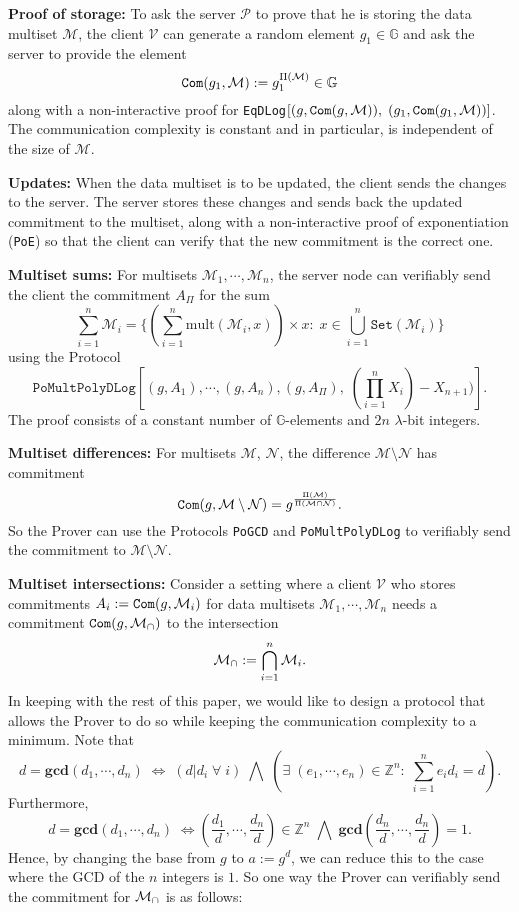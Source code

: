 \documentclass[11pt, lettersize, notitlepage, leqno, footskip=0.6cm]{article}
\newcommand{\bz}{\mathbb Z}
\newcommand{\pl}{\prod\limits}
\newcommand{\slim}{\sum\limits}
\newcommand{\ttt}{\texttt}
\newcommand{\sett}{\ttt{Set}}
\newcommand{\mul}{\mr{mult}}
\newcommand{\LRA}{\Longleftrightarrow}
\newcommand{\mc}{\mathcal}
\newcommand{\mb}{\mathbb}
\newcommand{\mbf}{\mathbf}
\newcommand{\mr}{\mathrm}
\newcommand{\sm}{\setminus}
\newcommand{\lam}{\lambda}
\newcommand{\mP}{\mc{P}}
\newcommand{\V}{\mc{V}}
\newcommand{\mcM}{\mc{M}}
\newcommand{\vs}{\vspace{-0.15cm}}
\newcommand{\noin}{\noindent}
\newcommand{\GCD}{\mbf{gcd}}
\numberwithin{equation}{section}
\begin{document}
\noin \textbf{Proof of storage:} To ask the server $\mP$ to prove that he is storing the data multiset $\mc{M}$, the client $\V$ can generate a random element $g_1\in\mb{G}$ and ask the server to provide the element \vs $$\protect{\verb|Com|}(g_1, \mc{M}):= g_1^{\Pi(\mc{M})}\in\mb{G}$$ along with a non-interactive proof for \verb|EqDLog|$[(g, \protect{\verb|Com|}(g, \mc{M})),\;(g_1, \protect{\verb|Com|}(g_1, \mc{M}))]$. The communication complexity is constant and in particular, is independent of the size of $\mc{M}$.\vspace{0.1cm}

\noin \textbf{Updates:} When the data multiset is to be updated, the client sends the changes to the server. The server stores these changes and sends back the updated commitment to the multiset, along with a non-interactive proof of exponentiation (\verb|PoE|) so that the client can verify that the new commitment is the correct one. \vspace{0.15cm}

\noin \textbf{Multiset sums:} For multisets $\mc{M}_1,\cdots,\mc{M}_n$, the server node can verifiably send the client the commitment $A_{\Pi}$ for the sum \vs $$\sum\limits_{i=1}^n \mc{M}_i = \Big\{(\sum\limits_{i=1}^n \mul(\mc{M}_i, x))\times x:\; x\in\bigcup\limits_{i=1}^n \sett(\mc{M}_i)\Big\} $$ using the Protocol \vs $$\ttt{PoMultPolyDLog}[(g, A_1),\cdots,(g,A_n), (g,A_{\Pi}),\;(\pl_{i=1}^{n}X_i)-X_{n+1})].$$ The proof consists of a constant number of $\mb{G}$-elements and $2n$ $\lam$-bit integers.

\bigskip

\noin \textbf{Multiset differences:} For multisets $\mc{M}$, $\mc{N}$, the difference $\mc{M}\sm \mc{N} $ has commitment \vs $$\protect{\verb|Com|}(g, \mc{M}\sm \mc{N}) = g^{\frac{\Pi(\mcM)}{\Pi(\mcM\cap \mc{N})}} .$$ So the Prover can use the Protocols \verb|PoGCD| and \verb|PoMultPolyDLog| to verifiably send the commitment to $\mc{M}\sm \mc{N} $. 

\bigskip

\noin \textbf{Multiset intersections:} Consider a setting where a client $\mc{V}$ who stores commitments $A_i:= \protect{\ttt{Com}}(g, \mc{M}_i)$ for data multisets $\mc{M}_1, \cdots, \mc{M}_n$ needs a commitment $\protect{\verb|Com|}(g, \mc{M}_{\tt{\cap}})$ to the intersection \vs $$\mc{M}_{\tt{\cap}}:=\bigcap\limits_{i=1}^n \mc{M}_i .$$ In keeping with the rest of this paper, we would like to design a protocol that allows the Prover to do so while keeping the communication complexity to a minimum. Note that \vs $$d = \GCD(d_1,\cdots,d_n)\; \LRA\; (d|d_i\;\forall\;i)\;\bigwedge\; (\exists\;(e_1,\cdots,e_n)\in\bz^n:\;\slim_{i=1}^n e_id_i = d ).$$ Furthermore, \vs $$d = \GCD(d_1,\cdots,d_n)\; \LRA \left(\frac{d_1}{d},\cdots, \frac{d_n}{d}\right)\in \bz^n\;\bigwedge\; \GCD\left(\frac{d_n}{d},\cdots, \frac{d_n}{d}\right)=1.$$ Hence, by changing the base from $g$ to $a:= g^d$, we can reduce this to the case where the GCD of the $n$ integers is $1$. So one way the Prover can verifiably send the commitment for $\mc{M}_{\tt{\cap}}$ is as follows:
\end{document}
